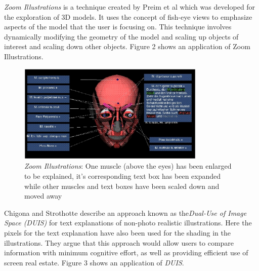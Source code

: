 \documentclass{article}
\begin{document}
\textit{Zoom Illustrations} is a technique created by Preim et al \cite{preim1997coherent} which was developed for the exploration of 3D models. It uses the concept of fish-eye views to emphasize aspects of the model that the user is focusing on. This technique involves dynamically modifying the geometry of the model and scaling up objects of interest and scaling down other objects. Figure 2 shows an application of Zoom Illustrations.
\begin{center}
	\begin{figure}[htbp]
    \hspace{0.1\textwidth}
		\includegraphics[width=0.8\textwidth]{Images/zoomIllustrations.jpg}
    	\caption{\textit{Zoom Illustrations}: One muscle (above the eyes) has been enlarged to be explained, it's corresponding text box has been expanded while other muscles and text boxes have been scaled down and moved
away \cite{preim1997coherent}}
    \end{figure}
\end{center}
Chigona and Strothotte \cite{Chigona:2002:CTE:569005.569010} describe an approach known as the\textit{Dual-Use of Image Space (DUIS)} for text explanations of non-photo realistic illustrations. Here the pixels for the text explanation have also been used for the shading in the illustrations. They argue that this approach would allow users to compare information with minimum cognitive effort, as well as providing efficient use of screen real estate. Figure 3 shows an application of \textit{DUIS}. 
\end{document}
